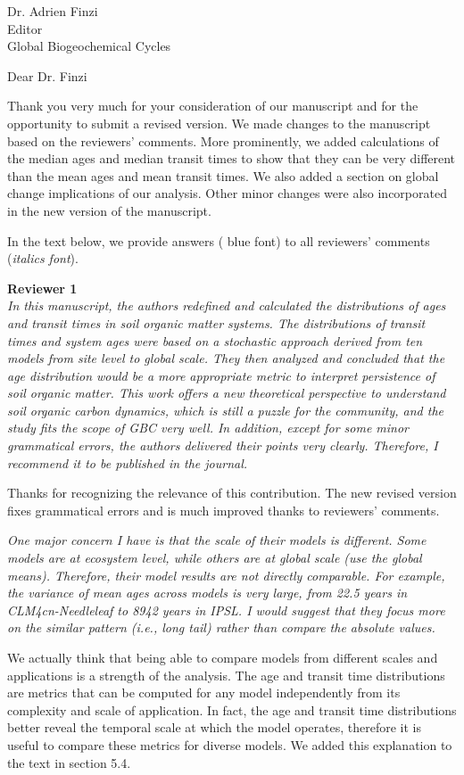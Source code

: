 \documentclass[11pt]{bgcletter}
\begin{document}
\begin{letter}{Dr. Adrien Finzi\\
 Editor \\ Global Biogeochemical Cycles}

\opening{Dear Dr. Finzi}
Thank you very much for your consideration of our manuscript and for the opportunity to submit a revised version. We made changes to the manuscript based on the reviewers' comments. More prominently,  we added calculations of the median ages and median transit times to show that they can be very different than the mean ages and mean transit times. We also added a section on global change implications of our analysis. Other minor changes were also incorporated in the new version of the manuscript. 

 In the text below, we provide answers ({\color{blue} blue font}) to all reviewers' comments ({\it italics font}). 

{\bf Reviewer 1} \\
{\it In this manuscript, the authors redefined and calculated the distributions of ages and transit times in soil organic matter systems. The distributions of transit times and system ages were based on a stochastic approach derived from ten models from site level to global scale. They then analyzed and concluded that the age distribution would be a more appropriate metric to interpret persistence of soil organic matter. This work offers a new theoretical perspective to understand soil organic carbon dynamics, which is still a puzzle for the community, and the study fits the scope of GBC very well. In addition, except for some minor grammatical errors, the authors delivered their points very clearly. Therefore, I recommend it to be published in the journal.}

{\color{blue} Thanks for recognizing the relevance of this contribution. The new revised version fixes grammatical errors and is much improved thanks to reviewers' comments.}

{\it One major concern I have is that the scale of their models is different. Some models are at ecosystem level, while others are at global scale (use the global means). Therefore, their model results are not directly comparable. For example, the variance of mean ages across models is very large, from 22.5 years in CLM4cn-Needleleaf to 8942 years in IPSL. I would suggest that they focus more on the similar pattern (i.e., long tail) rather than compare the absolute values.}

{\color{blue} We actually think that being able to compare models from different scales and applications is a strength of the analysis. The age and transit time distributions are metrics that can be computed for any model independently from its complexity and scale of application. In fact, the age and transit time distributions better reveal the temporal scale at which the model operates, therefore it is useful to compare these metrics for diverse models. We added this explanation to the text in section 5.4.}


\end{letter}
\end{document}

